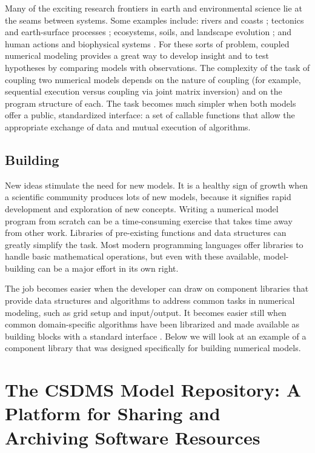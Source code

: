 \documentclass[12pt]{amsart}
\begin{document}
Many of the exciting research frontiers in earth and environmental science lie at the seams between systems. Some examples include: rivers and coasts \citep[e.g.,][]{ratliff2018exploring}; tectonics and earth-surface processes \citep[e.g.,][]{roy2016dynamic}; ecosystems, soils, and landscape evolution \citep[e.g.,][]{istanbulluoglu2005vegetation,pelletier2017way,lyons2020speciesevolver}; and human actions and biophysical systems \citep[e.g.,][]{robinson2018modelling}. For these sorts of problem, coupled numerical modeling provides a great way to develop insight and to test hypotheses by comparing models with observations. The complexity of the task of coupling two numerical models depends on the nature of coupling (for example, sequential execution versus coupling via joint matrix inversion) and on the program structure of each. The task becomes much simpler when both models offer a public, standardized interface: a set of callable functions that allow the appropriate exchange of data and mutual execution of algorithms.

\subsection{Building}\label{sec:build}

New ideas stimulate the need for new models. It is a healthy sign of growth when a scientific community produces lots of new models, because it signifies rapid development and exploration of new concepts. Writing a numerical model program from scratch can be a time-consuming exercise that takes time away from other work. Libraries of pre-existing functions and data structures can greatly simplify the task. Most modern programming languages offer libraries to handle basic mathematical operations, but even with these available, model-building can be a major effort in its own right. 

The job becomes easier when the developer can draw on component libraries that provide data structures and algorithms to address common tasks in numerical modeling, such as grid setup and input/output. It becomes easier still when common domain-specific algorithms have been librarized and made available as building blocks with a standard interface \citep[e.g.,][]{brown2014run}. Below we will look at an example of a component library that was designed specifically for building numerical models.



\section{The CSDMS Model Repository: A Platform for Sharing and Archiving Software Resources}
\end{document}
